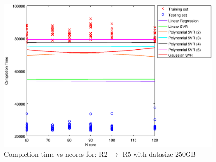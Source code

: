 
\begin {figure}[hbtp]
\centering
\includegraphics[width=\textwidth]{output/R2_R5_250_ALL_FEATURES/plot_R2_R5_250.eps}
\caption{Completion time vs ncores for: R2 $\rightarrow$ R5 with datasize 250GB}
\label{fig:coreonly_linear_R2_R5_250}
\end {figure}

